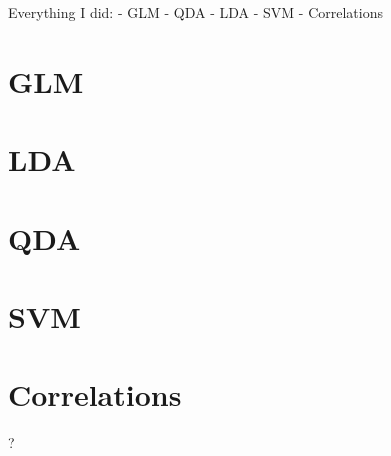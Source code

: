 Everything I did:
- GLM
- QDA
- LDA
- SVM
- Correlations

\section{GLM}

\section{LDA}

\section{QDA}

\section{SVM}

\section{Correlations} ?